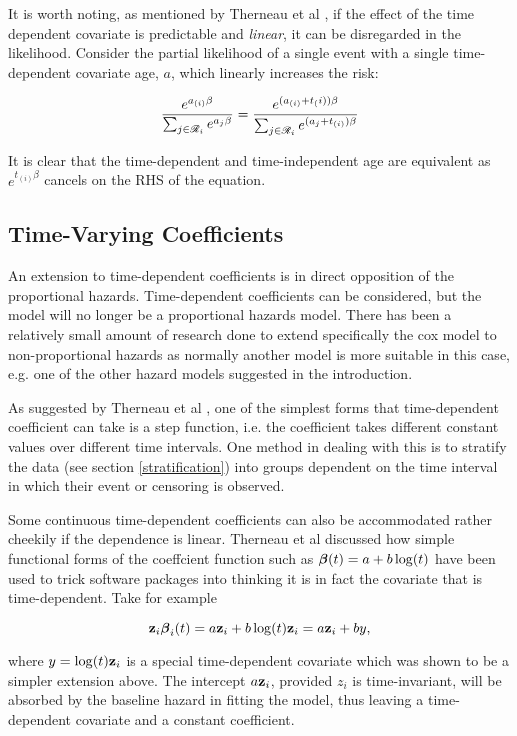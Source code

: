 It is worth noting, as mentioned by Therneau et al , if the effect of the time dependent covariate is predictable and \emph{linear}, it can be disregarded in the likelihood. Consider the partial likelihood of a single event with a single time-dependent covariate age, $a$, which linearly increases the risk:

\begin{equation}
    \frac{e^{a_{(i)}\beta}}{\sum_{j\in\mathscr{R}_i}e^{a_j\beta}}=\frac{e^{(a_{(i)}+t_({i}))\beta}}{\sum_{j\in\mathscr{R}_i}e^{(a_j+t_{(i)})\beta}}
\end{equation}

It is clear that the time-dependent and time-independent age are equivalent as $e^{t_{(i)}\beta}$ cancels on the RHS of the equation.

\subsection{Time-Varying Coefficients}

An extension to time-dependent coefficients is in direct opposition of the proportional hazards. Time-dependent coefficients can be considered, but the model will no longer be a proportional hazards model. There has been a relatively small amount of research done to extend specifically the cox model to non-proportional hazards as normally another model is more suitable in this case, e.g. one of the other hazard models suggested in the introduction. 

As suggested by Therneau et al , one of the simplest forms that time-dependent coefficient can take is a step function, i.e. the coefficient takes different constant values over different time intervals. One method in dealing with this is to stratify the data (see section \ref{stratification}) into groups dependent on the time interval in which their event or censoring is observed.

Some continuous time-dependent coefficients can also be accommodated rather cheekily if the dependence is linear. Therneau et al  discussed how simple functional forms of the coeffcient function such as $\boldsymbol{\beta}(t)=a+b\log(t)$ have been used to trick software packages into thinking it is in fact the covariate that is time-dependent. Take for example 

$$\textbf{z}_i\boldsymbol{\beta}_i(t)=a\textbf{z}_i+ b\log(t)\textbf{z}_i=a\textbf{z}_i+by,$$

where $y=\log(t)\textbf{z}_i$ is a special time-dependent covariate which was shown to be a simpler extension above. The intercept $a\textbf{z}_i$, provided $z_i$ is time-invariant, will be absorbed by the baseline hazard in fitting the model, thus leaving a time-dependent covariate and a constant coefficient.

